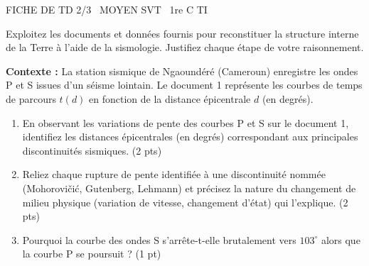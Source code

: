 \documentclass[11pt]{article}
\begin{document}
\begin{tcolorbox}[enhanced,colback=popink,colframe=popink,arc=10pt,boxrule=0pt,left=12pt,right=12pt,top=9pt,bottom=9pt]
{\color{white}\popxbold\small FICHE DE TD 2/3 \textbullet\ MOYEN \hfill SVT \textbullet\ 1re C TI\par}
\end{tcolorbox}
\vspace{4pt}
\noindent Exploitez les documents et données fournis pour reconstituer la structure interne de la Terre à l'aide de la sismologie. Justifiez chaque étape de votre raisonnement.

\begin{exercice}
    \textbf{Contexte :} La station sismique de Ngaoundéré (Cameroun) enregistre les ondes P et S issues d'un séisme lointain. Le document 1 représente les courbes de temps de parcours $t(d)$ en fonction de la distance épicentrale $d$ (en degrés).
    
    \begin{enumerate}
        \item En observant les variations de pente des courbes P et S sur le document 1, identifiez les distances épicentrales (en degrés) correspondant aux principales discontinuités sismiques. (2 pts)
        \item Reliez chaque rupture de pente identifiée à une discontinuité nommée (Mohorovičić, Gutenberg, Lehmann) et précisez la nature du changement de milieu physique (variation de vitesse, changement d'état) qui l'explique. (2 pts)
        \item Pourquoi la courbe des ondes S s'arrête-t-elle brutalement vers $103^\circ$ alors que la courbe P se poursuit ? (1 pt)
    \end{enumerate}
\end{exercice}
\end{document}
